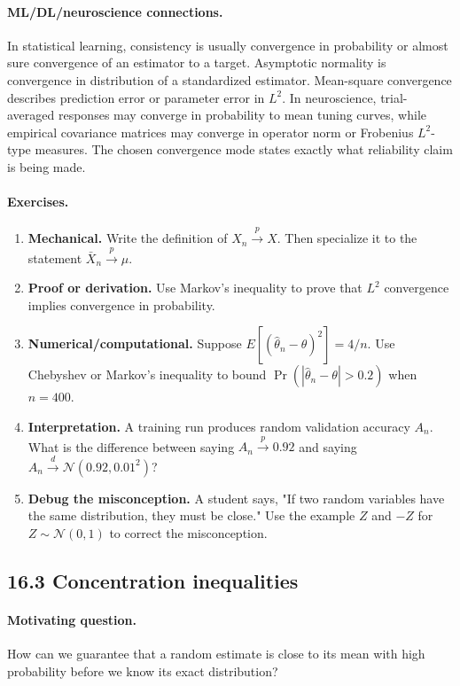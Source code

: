 \paragraph{ML/DL/neuroscience connections.}
In statistical learning, consistency is usually convergence in probability or almost sure convergence of an estimator to a target. Asymptotic normality is convergence in distribution of a standardized estimator. Mean-square convergence describes prediction error or parameter error in \(L^2\). In neuroscience, trial-averaged responses may converge in probability to mean tuning curves, while empirical covariance matrices may converge in operator norm or Frobenius \(L^2\)-type measures. The chosen convergence mode states exactly what reliability claim is being made.

\paragraph{Exercises.}
\begin{enumerate}[label=\textbf{16.2.\arabic*.}, leftmargin=*]
\item \textbf{Mechanical.} Write the definition of \(X_n\xrightarrow{p}X\). Then specialize it to the statement \(\bar X_n\xrightarrow{p}\mu\).
\item \textbf{Proof or derivation.} Use Markov's inequality to prove that \(L^2\) convergence implies convergence in probability.
\item \textbf{Numerical/computational.} Suppose \(E[(\hat\theta_n-\theta)^2]=4/n\). Use Chebyshev or Markov's inequality to bound \(\Pr(|\hat\theta_n-\theta|>0.2)\) when \(n=400\).
\item \textbf{Interpretation.} A training run produces random validation accuracy \(A_n\). What is the difference between saying \(A_n\xrightarrow{p}0.92\) and saying \(A_n\xrightarrow{d}\mathcal N(0.92,0.01^2)\)?
\item \textbf{Debug the misconception.} A student says, "If two random variables have the same distribution, they must be close." Use the example \(Z\) and \(-Z\) for \(Z\sim\mathcal N(0,1)\) to correct the misconception.
\end{enumerate}

\subsection{16.3 Concentration inequalities}

\paragraph{Motivating question.}
How can we guarantee that a random estimate is close to its mean with high probability before we know its exact distribution?

